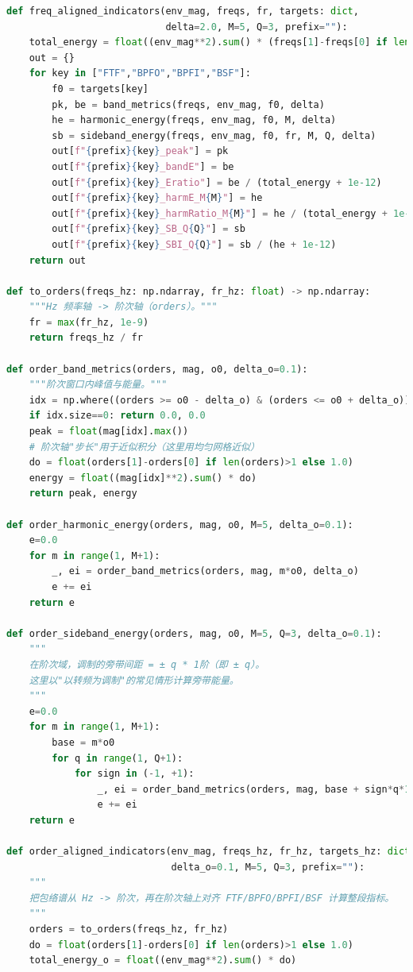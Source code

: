 \documentclass[a4paper]{CPIPC}
\numberwithin{equation}{section}
\begin{document}
\begin{lstlisting}[language=Python, caption=Feature Extraction]
def freq_aligned_indicators(env_mag, freqs, fr, targets: dict,
                            delta=2.0, M=5, Q=3, prefix=""):
    total_energy = float((env_mag**2).sum() * (freqs[1]-freqs[0] if len(freqs)>1 else 1.0))
    out = {}
    for key in ["FTF","BPFO","BPFI","BSF"]:
        f0 = targets[key]
        pk, be = band_metrics(freqs, env_mag, f0, delta)
        he = harmonic_energy(freqs, env_mag, f0, M, delta)
        sb = sideband_energy(freqs, env_mag, f0, fr, M, Q, delta)
        out[f"{prefix}{key}_peak"] = pk
        out[f"{prefix}{key}_bandE"] = be
        out[f"{prefix}{key}_Eratio"] = be / (total_energy + 1e-12)
        out[f"{prefix}{key}_harmE_M{M}"] = he
        out[f"{prefix}{key}_harmRatio_M{M}"] = he / (total_energy + 1e-12)
        out[f"{prefix}{key}_SB_Q{Q}"] = sb
        out[f"{prefix}{key}_SBI_Q{Q}"] = sb / (he + 1e-12)
    return out

def to_orders(freqs_hz: np.ndarray, fr_hz: float) -> np.ndarray:
    """Hz 频率轴 -> 阶次轴（orders）。"""
    fr = max(fr_hz, 1e-9)
    return freqs_hz / fr

def order_band_metrics(orders, mag, o0, delta_o=0.1):
    """阶次窗口内峰值与能量。"""
    idx = np.where((orders >= o0 - delta_o) & (orders <= o0 + delta_o))[0]
    if idx.size==0: return 0.0, 0.0
    peak = float(mag[idx].max())
    # 阶次轴"步长"用于近似积分（这里用均匀网格近似）
    do = float(orders[1]-orders[0] if len(orders)>1 else 1.0)
    energy = float((mag[idx]**2).sum() * do)
    return peak, energy

def order_harmonic_energy(orders, mag, o0, M=5, delta_o=0.1):
    e=0.0
    for m in range(1, M+1):
        _, ei = order_band_metrics(orders, mag, m*o0, delta_o)
        e += ei
    return e

def order_sideband_energy(orders, mag, o0, M=5, Q=3, delta_o=0.1):
    """
    在阶次域，调制的旁带间距 = ± q * 1阶（即 ± q）。
    这里以"以转频为调制"的常见情形计算旁带能量。
    """
    e=0.0
    for m in range(1, M+1):
        base = m*o0
        for q in range(1, Q+1):
            for sign in (-1, +1):
                _, ei = order_band_metrics(orders, mag, base + sign*q*1.0, delta_o)
                e += ei
    return e

def order_aligned_indicators(env_mag, freqs_hz, fr_hz, targets_hz: dict,
                             delta_o=0.1, M=5, Q=3, prefix=""):
    """
    把包络谱从 Hz -> 阶次，再在阶次轴上对齐 FTF/BPFO/BPFI/BSF 计算整段指标。
    """
    orders = to_orders(freqs_hz, fr_hz)
    do = float(orders[1]-orders[0] if len(orders)>1 else 1.0)
    total_energy_o = float((env_mag**2).sum() * do)


\end{lstlisting}
\end{document}
